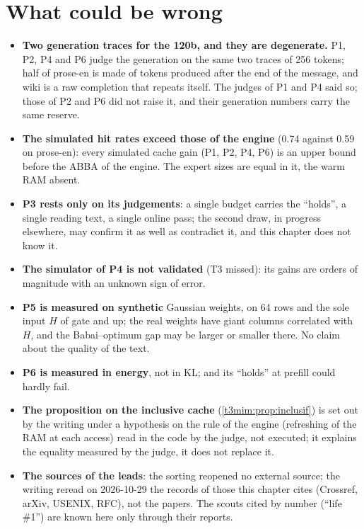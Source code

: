 \section{What could be wrong}\label{t3mim:sec:faux}

\begin{faux}
\begin{itemize}
\item \textbf{Two generation traces for the 120b, and they are degenerate.} P1, P2, P4 and P6 judge the generation on the same two traces of 256 tokens; half of prose-en is made of tokens produced after the end of the message, and wiki is a raw completion that repeats itself. The judges of P1 and P4 said so; those of P2 and P6 did not raise it, and their generation numbers carry the same reserve.
\item \textbf{The simulated hit rates exceed those of the engine} (0.74 against 0.59 on prose-en): every simulated cache gain (P1, P2, P4, P6) is an upper bound before the ABBA of the engine. The expert sizes are equal in it, the warm RAM absent.
\item \textbf{P3 rests only on its judgements}: a single budget carries the ``holds'', a single reading text, a single online pass; the second draw, in progress elsewhere, may confirm it as well as contradict it, and this chapter does not know it.
\item \textbf{The simulator of P4 is not validated} (T3 missed): its gains are orders of magnitude with an unknown sign of error.
\item \textbf{P5 is measured on synthetic} Gaussian weights, on 64 rows and the sole input $H$ of gate and up; the real weights have giant columns correlated with $H$, and the Babai--optimum gap may be larger or smaller there. No claim about the quality of the text.
\item \textbf{P6 is measured in energy}, not in KL; and its ``holds'' at prefill could hardly fail.
\item \textbf{The proposition on the inclusive cache} (\cref{t3mim:prop:inclusif}) is set out by the writing under a hypothesis on the rule of the engine (refreshing of the RAM at each access) read in the code by the judge, not executed; it explains the equality measured by the judge, it does not replace it.
\item \textbf{The sources of the leads}: the sorting reopened no external source; the writing reread on 2026-10-29 the records of those this chapter cites (Crossref, arXiv, USENIX, RFC), not the papers. The scouts cited by number (``life \#1'') are known here only through their reports.

\end{itemize}
\end{faux}
